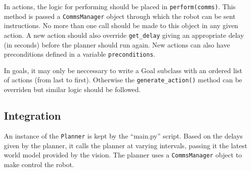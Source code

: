 In actions, the logic for performing should be placed in
\texttt{perform(comms)}. This method is passed a \texttt{CommsManager} object
through which the robot can be sent instructions. No more than one call should
be made to this object in any given action. A new action should also override
\texttt{get\_delay} giving an appropriate delay (in seconds) before the planner
should run again. New actions can also have preconditions defined in a variable
\texttt{preconditions}.

In goals, it may only be neccessary to write a Goal subclass with an ordered
list of actions (from last to first). Otherwise the \texttt{generate\_action()}
method can be overriden but similar logic should be followed.

\subsection{Integration}

An instance of the \texttt{Planner} is kept by the ``main.py'' script. Based on
the delays given by the planner, it calls the planner at varying intervals,
passing it the latest world model provided by the vision. The planner uses a
\texttt{CommsManager} object to make control the robot.
